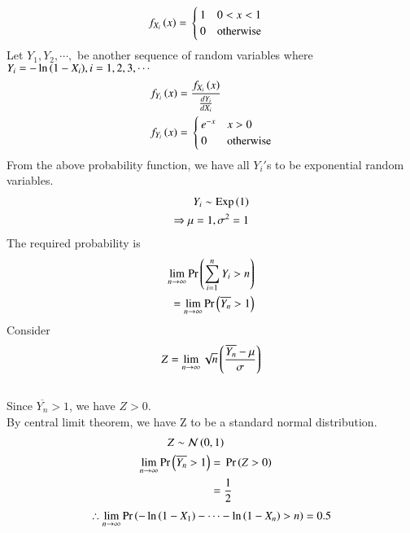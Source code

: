 \begin{align}
f_{X_{i}}\left(x\right) ={}&\begin{cases}
1 & 0<x<1\\
0 & \text{otherwise}
\end{cases}
\end{align}
Let $Y_{1},Y_{2},\cdots,$ be another sequence of random variables where $Y_{i} = -\ln{\ensuremath{\left(1-X_{i}\right)}},  i=1,2,3,\cdots$
\\ 
\begin{align}
f_{Y_{i}}\left(x\right)={}& \frac{f_{X_{i}}\left(x\right)}{\frac{dY_{i}}{dX_{i}}}\\
f_{Y_{i}}\left(x\right)={}&\begin{cases}
e^{-x} & x>0\\
0 & \text{otherwise}
\end{cases}
\end{align}
From the above probability function, we have all $Y_{i}'$s to be exponential random variables.\\
\begin{align}
Y_{i}\sim \text{Exp}\left(1\right)\\
\Rightarrow \mu = 1, \sigma^2 = 1
\end{align}
The required probability is 
\begin{align}
\lim_{n\to\infty}\Pr\left(\sum_{i=1}^{n}Y_{i}>n\right)\\
=\lim_{n\to\infty}\Pr\left(\overline{Y_{n}}>1\right)
\end{align}
Consider \begin{align}
Z=\lim_{n\to\infty}\sqrt{n}\left(\frac{\overline{Y_{n}}-\mu}{\sigma}\right)
\end{align}
\\ Since $\overline{Y_{n}}>1$, we have $Z>0$.\\
By central limit theorem, we have Z to be a standard normal distribution.
\begin{align}
Z \sim {\mathcal {N}}\left(0 ,1\right)\\
\lim_{n\to\infty}\Pr\left(\overline{Y_{n}}>1\right)={}&\Pr\left(Z>0\right)\\
={}&\frac{1}{2}
\end{align}
\begin{align}
\therefore \lim_{n\to\infty} \Pr\left(-\ln{\ensuremath{\left(1-X_{1}\right)}}-\cdots-\ln{\ensuremath{\left(1-X_{n}\right)}} > n\right)=0.5
\end{align}
